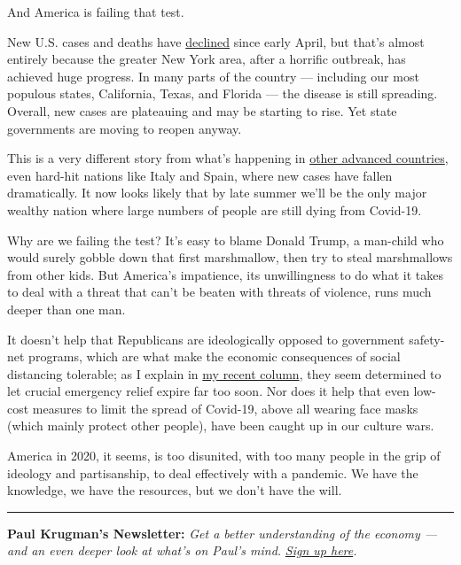 And America is failing that test.

New U.S. cases and deaths have
\href{https://www.nytimes.com/interactive/2020/us/coronavirus-us-cases.html}{declined}
since early April, but that's almost entirely because the greater New
York area, after a horrific outbreak, has achieved huge progress. In
many parts of the country --- including our most populous states,
California, Texas, and Florida --- the disease is still spreading.
Overall, new cases are plateauing and may be starting to rise. Yet state
governments are moving to reopen anyway.

This is a very different story from what's happening in
\href{https://www.bloomberg.com/graphics/2020-coronavirus-cases-world-map/?srnd=premium\&sref=qzusa8bC\#global-new-cases}{other
advanced countries}, even hard-hit nations like Italy and Spain, where
new cases have fallen dramatically. It now looks likely that by late
summer we'll be the only major wealthy nation where large numbers of
people are still dying from Covid-19.

Why are we failing the test? It's easy to blame Donald Trump, a
man-child who would surely gobble down that first marshmallow, then try
to steal marshmallows from other kids. But America's impatience, its
unwillingness to do what it takes to deal with a threat that can't be
beaten with threats of violence, runs much deeper than one man.

It doesn't help that Republicans are ideologically opposed to government
safety-net programs, which are what make the economic consequences of
social distancing tolerable; as I explain in
\href{https://www.nytimes.com/2020/06/08/opinion/coronavirus-jobs-report.html?action=click\&module=Opinion\&pgtype=Homepage}{my
recent column}, they seem determined to let crucial emergency relief
expire far too soon. Nor does it help that even low-cost measures to
limit the spread of Covid-19, above all wearing face masks (which mainly
protect other people), have been caught up in our culture wars.

America in 2020, it seems, is too disunited, with too many people in the
grip of ideology and partisanship, to deal effectively with a pandemic.
We have the knowledge, we have the resources, but we don't have the
will.

\begin{center}\rule{0.5\linewidth}{\linethickness}\end{center}

\textbf{Paul Krugman's Newsletter:} \emph{Get a better understanding of
the economy --- and an even deeper look at what's on Paul's mind.}
\href{https://www.nytimes.com/newsletters/paul-krugman}{\emph{Sign up
here}}\emph{.}

